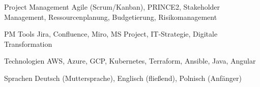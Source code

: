 

\begin{cvskills}

  \cvskill
    {Project Management} %
    {Agile (Scrum/Kanban), PRINCE2, Stakeholder Management, Ressourcenplanung, Budgetierung, Risikomanagement} %

  \cvskill
    {PM Tools} %
    {Jira, Confluence, Miro, MS Project, IT-Strategie, Digitale Transformation} %

  \cvskill
    {Technologien} %
    {AWS, Azure, GCP, Kubernetes, Terraform, Ansible, Java, Angular} %


  \cvskill
    {Sprachen} %
    {Deutsch (Muttersprache), Englisch (fließend), Polnisch (Anfänger)} %


\end{cvskills}
